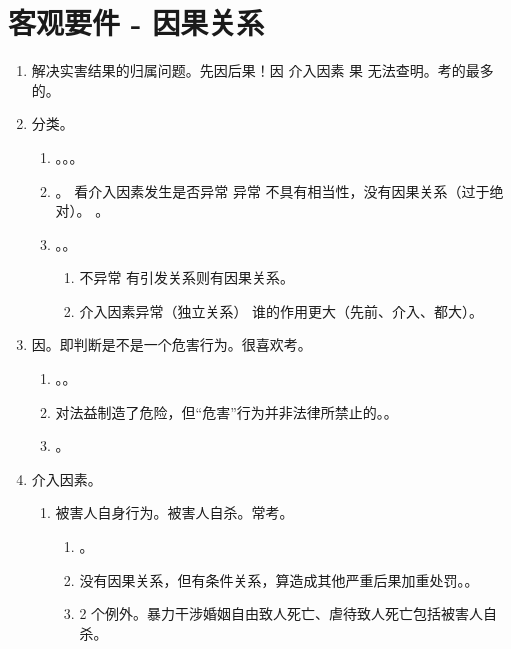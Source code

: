 \section{客观要件 - 因果关系}
\begin{enumerate}
  \item 解决实害结果的归属问题。先因后果！因 \yjt 介入因素 \yjt 果 \yjt 无法查明。考的最多的。
  \item 分类。
        \begin{enumerate}
          \item {}。。。
          \item {}。 \yjt
                看介入因素发生是否异常 \yjt
                异常 \yjt
                不具有相当性，没有因果关系（过于绝对）。
                。
          \item {}。。
                \begin{enumerate}
                  \item 不异常 \yjt 有引发关系则有因果关系。
                  \item 介入因素异常（独立关系） \yjt 谁的作用更大（先前、介入、都大）。
                \end{enumerate}
        \end{enumerate}
  \item 因。即判断是不是一个危害行为。很喜欢考。
        \begin{enumerate}
          \item {}。。
          \item 对法益制造了危险，但“危害”行为并非法律所禁止的。。
          \item {}。
        \end{enumerate}
  \item 介入因素。
        \begin{enumerate}
          \item 被害人自身行为。被害人自杀。常考。
                \begin{enumerate}
                  \item {}。
                  \item 没有因果关系，但有条件关系，算造成其他严重后果加重处罚。。
                  \item 2 个例外。暴力干涉婚姻自由致人死亡、虐待致人死亡包括被害人自杀。

\end{enumerate}
\end{enumerate}
\end{enumerate}
